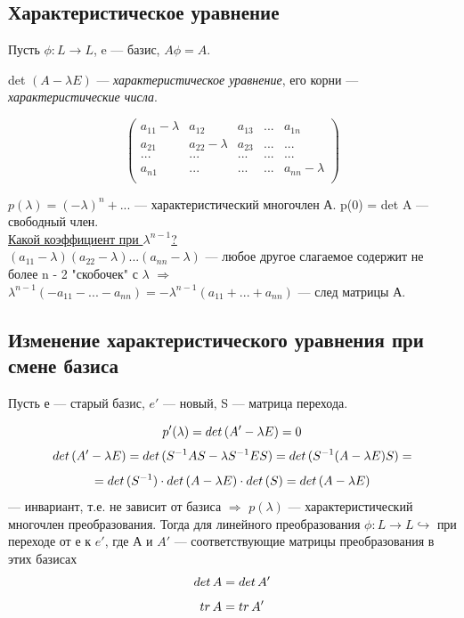 \subsection{Характеристическое уравнение}

Пусть $\phi : L \longrightarrow L$, e --- базис, $A\phi = A$.\\

\begin{definition}
    det $(A - \lambda E)$ --- \textit{характеристическое уравнение}, его корни --- \textit{характеристические числа}.
\end{definition}

\[
\begin{pmatrix}
    a_{11} - \lambda & a_{12} & a_{13} & ... & a_{1n} \\
    a_{21} & a_{22} - \lambda & a_{23} & ... & ...\\
    ... & ... & ... & ... & ... \\
    a_{n1} & ... & ... & ... & a_{nn} - \lambda \\
\end{pmatrix}
\]

 $p(\lambda) = (-\lambda)^n + ...$ --- характеристический многочлен А. p(0) = det A --- свободный член.\\


 \underline{Какой коэффициент при $\lambda^{n - 1}$?}\\

$(a_{11} - \lambda)(a_{22} - \lambda) ... (a_{nn} - \lambda)$ --- любое другое слагаемое содержит  не более n - 2 "скобочек" с $\lambda$ $\Longrightarrow$ $\lambda^{n - 1}(-a_{11} - ... - a_{nn}) = -\lambda^{n - 1}(a_{11} + ... + a_{nn})
$ --- след матрицы А.\\


\subsection{Изменение характеристического уравнения при смене базиса}

Пусть е --- старый базис, $e'$ --- новый, S --- матрица перехода.

\[
p'(\lambda) = det\thinspace (A' - \lambda E) = 0
\]
\[
det\thinspace (A' - \lambda E) = det\thinspace (S^{-1}AS - \lambda S^{-1}ES) = det\thinspace (S^{-1}(A - \lambda E)S) = 
\]
\[
= det\thinspace (S^{-1}) \cdot det\thinspace (A - \lambda E) \cdot det\thinspace (S) = det\thinspace (A - \lambda E)
\]
--- инвариант, т.е. не зависит от базиса $\Longrightarrow$ $p(\lambda)$ --- характеристический многочлен преобразования. Тогда для линейного преобразования $\phi : L \longrightarrow L \hookrightarrow$ при переходе от е к $e'$, где А и $A'$ --- соответствующие матрицы преобразования в этих базисах
\[
det\thinspace A = det\thinspace A'
\]
\[
tr\thinspace A = tr\thinspace A'
\]


